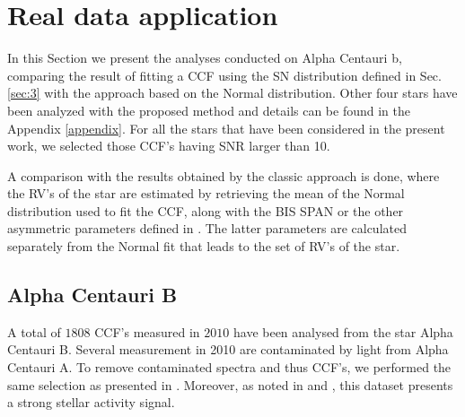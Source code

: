 \documentclass[11pt, oneside]{article}
\begin{document}
\section{Real data application} \label{sec:4}

In this Section we present the analyses conducted on Alpha Centauri b, comparing the result of fitting a CCF using the SN distribution defined in Sec. \ref{sec:3} with the approach based on the Normal distribution. Other four stars have been analyzed with the proposed method and details can be found in the Appendix \ref{appendix}. For all the stars that have been considered in the present work, we selected those CCF's having SNR larger than 10.

 A comparison with the results obtained by the classic approach is done, where the RV's of the star are estimated by retrieving the mean of the Normal distribution used to fit the CCF, along with the BIS SPAN or the other asymmetric parameters defined in \citet{Figueira-2013}. The latter parameters are calculated separately from the Normal fit that leads to the set of RV's of the star.

\subsection{Alpha Centauri B} \label{sec:alphacentb}

A total of $1808$ CCF's measured in $2010$ have been analysed from the star Alpha Centauri B. Several measurement in 2010 are contaminated by light from Alpha Centauri A. To remove contaminated spectra and thus CCF's, we performed the same selection as presented in \citet{Dumusque-2012}. Moreover, as noted in \citet{Dumusque-2012} and \citet{Thompson-2017}, this dataset presents a strong stellar activity signal.
\end{document}

